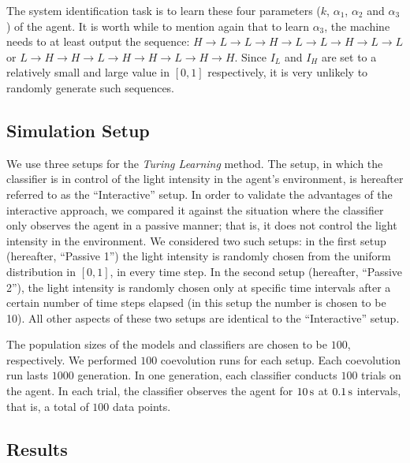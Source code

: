 The system identification task is to learn these four parameters ($k$, $\alpha_1$, $\alpha_2$ and $\alpha_3$) of the agent. It is worth while to mention again that to learn $\alpha_3$, the machine needs to at least output the sequence: $H\rightarrow L\rightarrow L\rightarrow H\rightarrow L\rightarrow L\rightarrow H\rightarrow L\rightarrow L$ or $L\rightarrow H\rightarrow H\rightarrow L\rightarrow H\rightarrow H\rightarrow L\rightarrow H\rightarrow H$. Since $I_L$ and $I_H$ are set to a relatively small and large value in $[0,1]$ respectively, it is very unlikely to randomly generate such sequences.

\subsection{Simulation Setup}\label{sec:simulation_setup_deterministic_interaction}

We use three setups for the \textit{Turing Learning} method. The setup, in which the classifier is in control of the light intensity in the agent's environment, is hereafter referred to as the ``Interactive'' setup. In order to validate the advantages of the interactive approach, we compared it against the situation where the classifier only observes the agent in a passive manner; that is, it does not control the light intensity in the environment. We considered two such setups: in the first setup (hereafter, ``Passive 1'') the light intensity is randomly chosen from the uniform distribution in $\left[0,1\right]$, in every time step. In the second setup (hereafter, ``Passive 2''), the light intensity is randomly chosen only at specific time intervals after a certain number of time steps elapsed (in this setup the number is chosen to be 10). All other aspects of these two setups are identical to the ``Interactive'' setup. 

The population sizes of the models and classifiers are chosen to be $100$, respectively. We performed $100$ coevolution runs for each setup. Each coevolution run lasts $1000$ generation. In one generation, each classifier conducts $100$ trials on the agent. In each trial, the classifier observes the agent for $\unit[10]{s}$ at $\unit[0.1]{s}$ intervals, that is, a total of $100$ data points.

\subsection{Results}\label{sec:results_interaction_deterministic}

